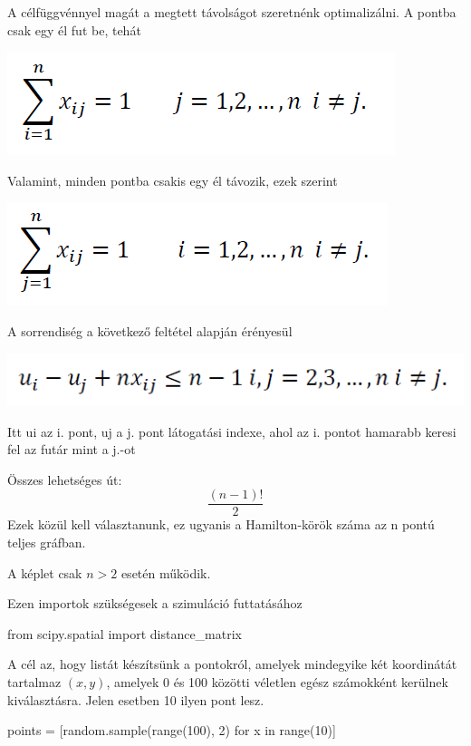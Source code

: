 A célfüggvénnyel magát a megtett távolságot szeretnénk optimalizálni. A pontba csak egy él fut be, tehát

\includegraphics[scale=0.5]{images/3tsp.png}

Valamint, minden pontba csakis egy él távozik, ezek szerint

\includegraphics[scale=0.5]{images/4tsp.png}

A sorrendiség a következő feltétel alapján érényesül

\includegraphics[scale=0.5]{images/5tsp.png}

Itt ui az i. pont, uj a j. pont látogatási indexe, ahol az i. pontot hamarabb keresi fel az futár mint a j.-ot


Összes lehetséges út:
\[
\dfrac{(n-1)!}{2}
\]
Ezek közül kell választanunk, ez ugyanis a Hamilton-körök száma az n pontú teljes gráfban.

A képlet csak $n > 2$ esetén működik.

Ezen importok szükségesek a szimuláció futtatásához

\begin{python}
from scipy.spatial import distance_matrix
\end{python}

A cél az, hogy listát készítsünk a pontokról, amelyek mindegyike két koordinátát tartalmaz $(x, y)$, amelyek 0 és 100 közötti véletlen egész számokként kerülnek kiválasztásra. Jelen esetben 10 ilyen pont lesz.

\begin{python}
points = [random.sample(range(100), 2) for x in range(10)]
\end{python}

